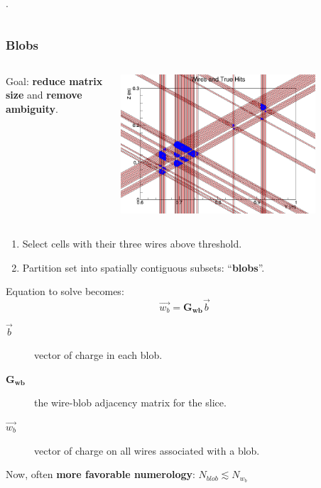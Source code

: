 \begin{frame}
\begin{columns}
\begin{column}{0.65\textwidth}
      \vspace{5mm}

      .

    \end{column}
  \end{columns}
\end{frame}


\begin{frame}
  \frametitle{Blobs}
  \vspace{-10mm}
  \begin{columns}
    \begin{column}{0.6\textwidth}
      Goal: \textbf{reduce matrix size} and \textbf{remove ambiguity}.
    \end{column}
    \begin{column}{0.4\textwidth}
      \includegraphics[width=0.8\textwidth]{wires-and-true-hits.png}          
    \end{column}
  \end{columns}
      
  \begin{enumerate}
  \item Select cells with their three wires above threshold.
  \item Partition set into spatially contiguous subsets: ``\textbf{blobs}''.
  \end{enumerate}
  Equation to solve becomes:
  \[\vec{w_b} = \mathbf{G_{wb}} \vec{b}\]

  \begin{description}
  \item[$\vec{b}$] vector of charge in each blob.
  \item[$\mathbf{G_{wb}}$] the wire-blob adjacency matrix for the slice.
  \item[$\vec{w_b}$] vector of charge on all wires associated with a blob.
  \end{description}

  Now, often \textbf{more favorable numerology}: $N_{blob} \lesssim N_{w_b}$
\end{frame}

